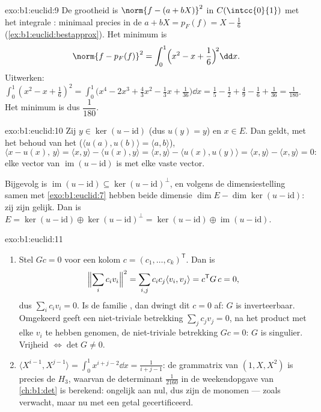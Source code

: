 \begin{solution}{exo:b1:euclid:9}
De grootheid is $\norm{f - (a + bX)}^2$ in $C(\intcc{0}{1})$ met
het integrale : minimaal precies in de  $a + bX = p_F(f) = X - \frac16$
(\cref{ex:b1:euclid:bestapprox}). Het minimum is
\[
\norm{f - p_F(f)}^2 = \int_0^1 \Bigl(x^2 - x + \frac16\Bigr)^{\!2}
\dd x .
\]
Uitwerken: $\int_0^1 (x^2 - x + \frac16)^2 = \int_0^1 \bigl(x^4 -
2x^3 + \frac{4}{3}x^2 - \frac13 x + \frac{1}{36}\bigr)\dd x =
\frac15 - \frac12 + \frac49 - \frac16 + \frac{1}{36} =
\frac{1}{180}$. Het minimum is dus $\dfrac{1}{180}$.
\end{solution}

\begin{solution}{exo:b1:euclid:10}
Zij $y \in \ker(u - \mathrm{id})$ (dus $u(y) = y$) en $x \in E$.
Dan geldt, met het behoud van het  ($\langle u(a),
u(b)\rangle = \langle a, b\rangle$),
\[
\langle x - u(x),\, y\rangle
= \langle x, y\rangle - \langle u(x), y\rangle
= \langle x, y\rangle - \langle u(x), u(y)\rangle
= \langle x, y\rangle - \langle x, y\rangle = 0 :
\]
elke vector van $\operatorname{im}(u - \mathrm{id})$ is 
met elke vaste vector.

Bijgevolg is $\operatorname{im}(u - \mathrm{id}) \subseteq \ker(u -
\mathrm{id})^{\perp}$, en volgens de dimensiestelling samen met
\cref{exo:b1:euclid:7} hebben beide dimensie $\dim E - \dim\ker(u -
\mathrm{id})$: zij zijn gelijk. Dan is $E = \ker(u - \mathrm{id})
\oplus \ker(u - \mathrm{id})^\perp = \ker(u - \mathrm{id}) \oplus
\operatorname{im}(u - \mathrm{id})$.
\end{solution}

\begin{solution}{exo:b1:euclid:11}
\begin{enumerate}
  \item Stel $Gc = 0$ voor een kolom $c = (c_1, \dots,
        c_k)^{\mathsf T}$. Dan is
        \[
        \Bigl\lVert\sum_i c_i v_i\Bigr\rVert^2
        = \sum_{i,j} c_i c_j \langle v_i, v_j\rangle
        = c^{\mathsf T} G\, c = 0,
        \]
        dus $\sum_i c_i v_i = 0$. Is de familie , dan dwingt
        dit $c = 0$ af: $G$ is inverteerbaar. Omgekeerd geeft een
        niet-triviale betrekking $\sum_j c_j v_j = 0$, na het
        product met elke $v_i$ te hebben genomen, de niet-triviale
        betrekking $Gc = 0$: $G$ is singulier. Vrijheid $\iff \det
        G \neq 0$.
  \item $\langle X^{i-1}, X^{j-1}\rangle = \int_0^1 x^{i+j-2}\dd x
        = \frac{1}{i+j-1}$: de grammatrix van $(1, X, X^2)$ is
        precies de  $H_3$, waarvan de determinant
        $\frac1{2160}$ in de weekendopgave van \cref{ch:b1:det} is
        berekend: ongelijk aan nul, dus zijn de monomen  ---
        zoals verwacht, maar nu met een getal gecertificeerd.
\end{enumerate}
\end{solution}

